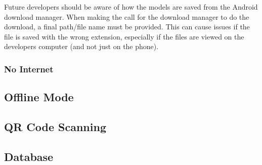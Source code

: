                 Future developers should be aware of how the models are saved from the Android download manager.  When making the call for the download manager to do the download, a final path/file name must be provided.  This can cause issues if the file is saved with the wrong extension, especially if the files are viewed on the developers computer (and not just on the phone).
        
        \subsubsection{No Internet}
        
    \subsection{Offline Mode}

    \subsection{QR Code Scanning}

    \subsection{Database}
